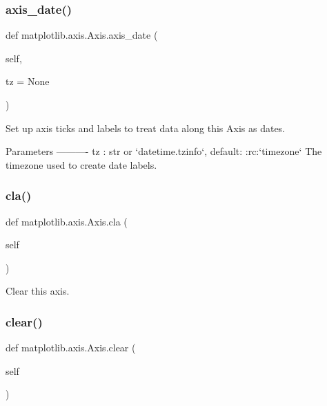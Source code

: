 \mbox{\label{classmatplotlib_1_1axis_1_1Axis_a937fa76e00d5ae0f987771fb9ff2161c}} 
\subsubsection{\texorpdfstring{axis\+\_\+date()}{axis\_date()}}
{\footnotesize\ttfamily def matplotlib.\+axis.\+Axis.\+axis\+\_\+date (\begin{DoxyParamCaption}\item[{}]{self,  }\item[{}]{tz = {\ttfamily None} }\end{DoxyParamCaption})}

\begin{DoxyVerb}Set up axis ticks and labels to treat data along this Axis as dates.

Parameters
----------
tz : str or `datetime.tzinfo`, default: :rc:`timezone`
    The timezone used to create date labels.
\end{DoxyVerb}
 \mbox{\label{classmatplotlib_1_1axis_1_1Axis_a5c14aa0c6f782605bc11c34e51249014}} 
\subsubsection{\texorpdfstring{cla()}{cla()}}
{\footnotesize\ttfamily def matplotlib.\+axis.\+Axis.\+cla (\begin{DoxyParamCaption}\item[{}]{self }\end{DoxyParamCaption})}

\begin{DoxyVerb}Clear this axis.\end{DoxyVerb}
 \mbox{\label{classmatplotlib_1_1axis_1_1Axis_ad4467e20957726703ee5ae2456714eb9}} 
\subsubsection{\texorpdfstring{clear()}{clear()}}
{\footnotesize\ttfamily def matplotlib.\+axis.\+Axis.\+clear (\begin{DoxyParamCaption}\item[{}]{self }\end{DoxyParamCaption})}


